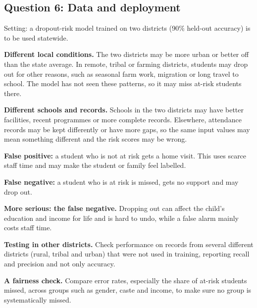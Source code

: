 \subsection{Question 6: Data and deployment}
Setting: a dropout-risk model trained on two districts (90\% held-out accuracy) is to be used statewide.

\textbf{Different local conditions.} The two districts may be more urban or better off than
the state average. In remote, tribal or farming districts, students may drop out for other
reasons, such as seasonal farm work, migration or long travel to school. The model has not
seen these patterns, so it may miss at-risk students there.

\textbf{Different schools and records.} Schools in the two districts may have better
facilities, recent programmes or more complete records. Elsewhere, attendance records may be
kept differently or have more gaps, so the same input values may mean something different and
the risk scores may be wrong.

\textbf{False positive:} a student who is not at risk gets a home visit. This uses scarce staff
time and may make the student or family feel labelled.

\textbf{False negative:} a student who is at risk is missed, gets no support and may drop out.

\textbf{More serious: the false negative.} Dropping out can affect the child's education and
income for life and is hard to undo, while a false alarm mainly costs staff time.

\textbf{Testing in other districts.} Check performance on records from several different
districts (rural, tribal and urban) that were not used in training, reporting recall and
precision and not only accuracy.

\textbf{A fairness check.} Compare error rates, especially the share of at-risk students
missed, across groups such as gender, caste and income, to make sure no group is
systematically missed.
